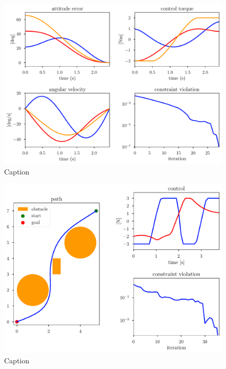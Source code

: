 \begin{figure}
    \centering
    \includegraphics[width=0.9\linewidth]{bundles/examples/satellite_fig_2.pdf}
    \caption{Caption}
    \label{fig:btb:satellite}
\end{figure}

\begin{figure}
    \centering
    \includegraphics[width=0.9\linewidth]{bundles/examples/obstacle_fig.pdf}
    \caption{Caption}
    \label{fig:btb:obstacle}
\end{figure}


